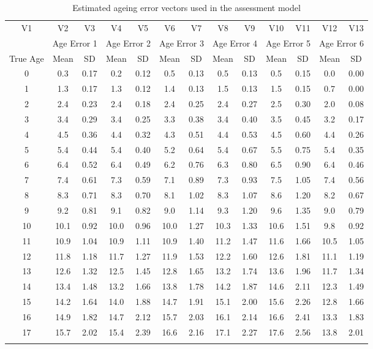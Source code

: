 \documentclass[12pt,]{article}
\begin{document}
\begin{landscape}
\begin{longtable}{ccccccccccccc}
\caption{Estimated ageing error vectors used in the assessment model} \\ 
  \hline
V1 & V2 & V3 & V4 & V5 & V6 & V7 & V8 & V9 & V10 & V11 & V12 & V13 \\ 
   & \multicolumn{2}{c}{Age Error 1} &  \multicolumn{2}{c}{Age Error 2} & \multicolumn{2}{c}{Age Error 3} & \multicolumn{2}{c}{Age Error 4} & \multicolumn{2}{c}{Age Error 5} & \multicolumn{2}{c}{Age Error 6} \\
 True Age & Mean & SD & Mean &  SD  & Mean &  SD & Mean & SD & Mean &  SD & Mean &  SD \\
 \hline
0 & 0.3 & 0.17 & 0.2 & 0.12 & 0.5 & 0.13 & 0.5 & 0.13 & 0.5 & 0.15 & 0.0 & 0.00 \\ 
  1 & 1.3 & 0.17 & 1.3 & 0.12 & 1.4 & 0.13 & 1.5 & 0.13 & 1.5 & 0.15 & 0.7 & 0.00 \\ 
  2 & 2.4 & 0.23 & 2.4 & 0.18 & 2.4 & 0.25 & 2.4 & 0.27 & 2.5 & 0.30 & 2.0 & 0.08 \\ 
  3 & 3.4 & 0.29 & 3.4 & 0.25 & 3.3 & 0.38 & 3.4 & 0.40 & 3.5 & 0.45 & 3.2 & 0.17 \\ 
  4 & 4.5 & 0.36 & 4.4 & 0.32 & 4.3 & 0.51 & 4.4 & 0.53 & 4.5 & 0.60 & 4.4 & 0.26 \\ 
  5 & 5.4 & 0.44 & 5.4 & 0.40 & 5.2 & 0.64 & 5.4 & 0.67 & 5.5 & 0.75 & 5.4 & 0.35 \\ 
  6 & 6.4 & 0.52 & 6.4 & 0.49 & 6.2 & 0.76 & 6.3 & 0.80 & 6.5 & 0.90 & 6.4 & 0.46 \\ 
  7 & 7.4 & 0.61 & 7.3 & 0.59 & 7.1 & 0.89 & 7.3 & 0.93 & 7.5 & 1.05 & 7.4 & 0.56 \\ 
  8 & 8.3 & 0.71 & 8.3 & 0.70 & 8.1 & 1.02 & 8.3 & 1.07 & 8.6 & 1.20 & 8.2 & 0.67 \\ 
  9 & 9.2 & 0.81 & 9.1 & 0.82 & 9.0 & 1.14 & 9.3 & 1.20 & 9.6 & 1.35 & 9.0 & 0.79 \\ 
  10 & 10.1 & 0.92 & 10.0 & 0.96 & 10.0 & 1.27 & 10.3 & 1.33 & 10.6 & 1.51 & 9.8 & 0.92 \\ 
  11 & 10.9 & 1.04 & 10.9 & 1.11 & 10.9 & 1.40 & 11.2 & 1.47 & 11.6 & 1.66 & 10.5 & 1.05 \\ 
  12 & 11.8 & 1.18 & 11.7 & 1.27 & 11.9 & 1.53 & 12.2 & 1.60 & 12.6 & 1.81 & 11.1 & 1.19 \\ 
  13 & 12.6 & 1.32 & 12.5 & 1.45 & 12.8 & 1.65 & 13.2 & 1.74 & 13.6 & 1.96 & 11.7 & 1.34 \\ 
  14 & 13.4 & 1.48 & 13.2 & 1.66 & 13.8 & 1.78 & 14.2 & 1.87 & 14.6 & 2.11 & 12.3 & 1.49 \\ 
  15 & 14.2 & 1.64 & 14.0 & 1.88 & 14.7 & 1.91 & 15.1 & 2.00 & 15.6 & 2.26 & 12.8 & 1.66 \\ 
  16 & 14.9 & 1.82 & 14.7 & 2.12 & 15.7 & 2.03 & 16.1 & 2.14 & 16.6 & 2.41 & 13.3 & 1.83 \\ 
  17 & 15.7 & 2.02 & 15.4 & 2.39 & 16.6 & 2.16 & 17.1 & 2.27 & 17.6 & 2.56 & 13.8 & 2.01 \\ 
   \hline
\hline
\label{tab:Age_Error}
\end{longtable}

\end{landscape}
\end{document}
